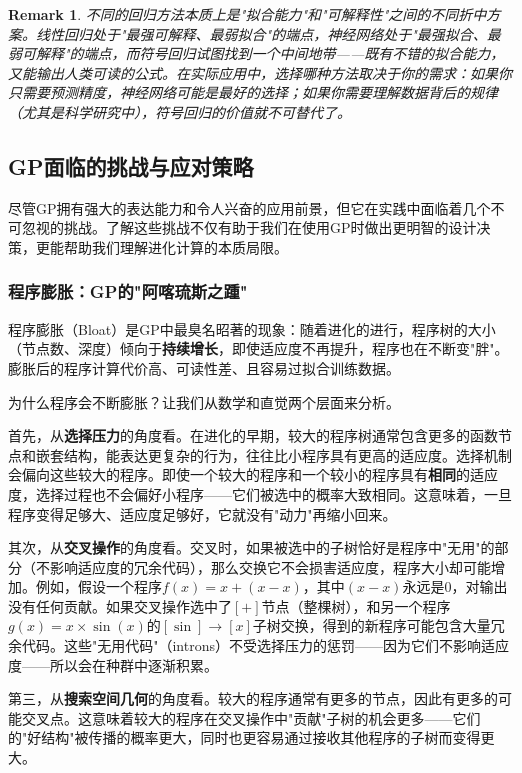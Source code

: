 \documentclass[lang=cn,zihao=-4,a4paper,fontset=windows]{beautybook}
\newtheorem*{remark}{\textbf{Remark}}
\begin{document}
\begin{remark}
不同的回归方法本质上是"拟合能力"和"可解释性"之间的不同折中方案。线性回归处于"最强可解释、最弱拟合"的端点，神经网络处于"最强拟合、最弱可解释"的端点，而符号回归试图找到一个中间地带——既有不错的拟合能力，又能输出人类可读的公式。在实际应用中，选择哪种方法取决于你的需求：如果你只需要预测精度，神经网络可能是最好的选择；如果你需要理解数据背后的规律（尤其是科学研究中），符号回归的价值就不可替代了。
\end{remark}

\subsection{GP面临的挑战与应对策略}

尽管GP拥有强大的表达能力和令人兴奋的应用前景，但它在实践中面临着几个不可忽视的挑战。了解这些挑战不仅有助于我们在使用GP时做出更明智的设计决策，更能帮助我们理解进化计算的本质局限。

\subsubsection{程序膨胀：GP的"阿喀琉斯之踵"}

程序膨胀（Bloat）是GP中最臭名昭著的现象：随着进化的进行，程序树的大小（节点数、深度）倾向于\textbf{持续增长}，即使适应度不再提升，程序也在不断变"胖"。膨胀后的程序计算代价高、可读性差、且容易过拟合训练数据。

为什么程序会不断膨胀？让我们从数学和直觉两个层面来分析。

首先，从\textbf{选择压力}的角度看。在进化的早期，较大的程序树通常包含更多的函数节点和嵌套结构，能表达更复杂的行为，往往比小程序具有更高的适应度。选择机制会偏向这些较大的程序。即使一个较大的程序和一个较小的程序具有\textbf{相同}的适应度，选择过程也不会偏好小程序——它们被选中的概率大致相同。这意味着，一旦程序变得足够大、适应度足够好，它就没有"动力"再缩小回来。

其次，从\textbf{交叉操作}的角度看。交叉时，如果被选中的子树恰好是程序中"无用"的部分（不影响适应度的冗余代码），那么交换它不会损害适应度，程序大小却可能增加。例如，假设一个程序$f(x) = x + (x - x)$，其中$(x - x)$永远是0，对输出没有任何贡献。如果交叉操作选中了$[+]$节点（整棵树），和另一个程序$g(x) = x \times \sin(x)$的$[\sin] \to [x]$子树交换，得到的新程序可能包含大量冗余代码。这些"无用代码"（introns）不受选择压力的惩罚——因为它们不影响适应度——所以会在种群中逐渐积累。

第三，从\textbf{搜索空间几何}的角度看。较大的程序通常有更多的节点，因此有更多的可能交叉点。这意味着较大的程序在交叉操作中"贡献"子树的机会更多——它们的"好结构"被传播的概率更大，同时也更容易通过接收其他程序的子树而变得更大。
\end{document}
